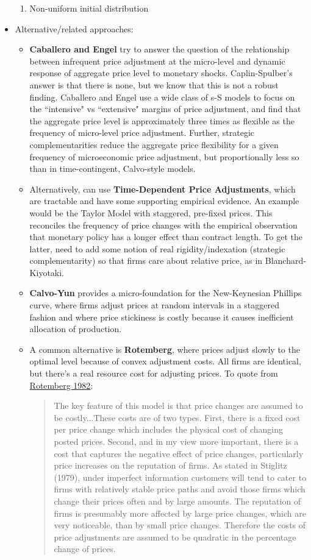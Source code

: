 \documentclass[12pt]{article}
\begin{document}
\begin{itemize}
\begin{enumerate}
        \item Non-uniform initial distribution
    \end{enumerate}
    \item Alternative/related approaches:
    \begin{itemize}
        \item \textbf{Caballero and Engel} try to answer the question of the relationship between infrequent price adjustment at the micro-level and dynamic response of aggregate price level to monetary shocks. Caplin-Spulber's answer is that there is none, but we know that this is not a robust finding. Caballero and Engel use a wide class of s-S models to focus on the ``intensive" vs ``extensive" margins of price adjustment, and find that the aggregate price level is approximately three times as flexible as the frequency of micro-level price adjustment. Further, strategic complementarities reduce the aggregate price flexibility for a given frequency of microeconomic price adjustment, but proportionally less so than in time-contingent, Calvo-style models.
        \item Alternatively, can use \textbf{Time-Dependent Price Adjustments}, which are tractable and have some supporting empirical evidence. An example would be the Taylor Model with staggered, pre-fixed prices. This reconciles the frequency of price changes with the empirical observation that monetary policy has a longer effect than contract length. To get the latter, need to add some notion of real rigidity/indexation (strategic complementarity) so that firms care about relative price, as in Blanchard-Kiyotaki.
        \item \textbf{Calvo-Yun} provides a micro-foundation for the New-Keynesian Phillips curve, where firms adjust prices at random intervals in a staggered fashion and where price stickiness is costly because it causes inefficient allocation of production. 
        \item A common alternative is \textbf{Rotemberg}, where prices adjust slowly to the optimal level because of convex adjustment costs. All firms are identical, but there's a real resource cost for adjusting prices. To quote from \href{https://www.jstor.org/stable/1830944?seq=1#metadata_info_tab_contents}{Rotemberg 1982}:
        \begin{quote}
            The key feature of this model is that price changes are assumed to be costly...These costs are of two types. First, there is a fixed cost per price change which includes the physical cost of changing posted prices. Second, and in my view more important, there is a cost that captures the negative effect of price changes, particularly price increases on the reputation of firms. As stated in Stiglitz (1979), under imperfect information customers will tend to cater to firms with relatively stable price paths and avoid those firms which change their prices often and by large amounts. The reputation of firms is presumably more affected by large price changes, which are very noticeable, than by small price changes. Therefore the costs of price adjustments are assumed to be quadratic in the percentage change of prices.

\end{quote}
\end{itemize}
\end{itemize}
\end{document}
